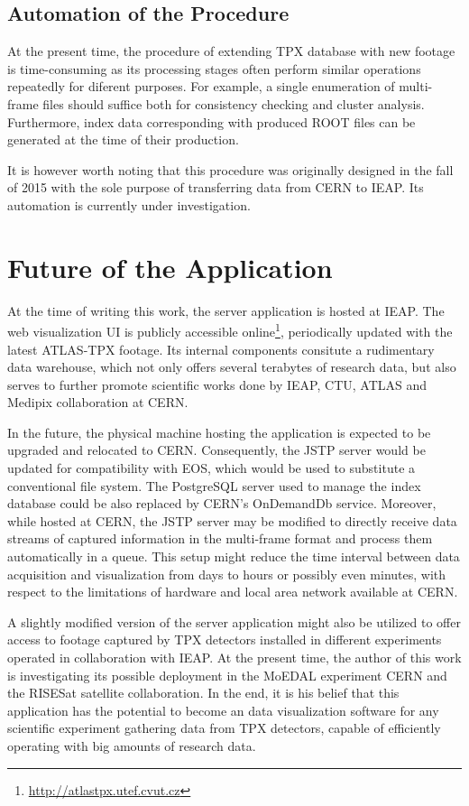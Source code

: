 \subsection{Automation of the Procedure}
\label{import-automation}
At the present time, the procedure of extending TPX database with new footage is time-consuming as its processing stages often perform similar operations repeatedly for diferent purposes. For example, a single enumeration of multi-frame files should suffice both for consistency checking and cluster analysis. Furthermore, index data corresponding with produced ROOT files can be generated at the time of their production.

It is however worth noting that this procedure was originally designed in the fall of 2015 with the sole purpose of transferring data from CERN to IEAP. Its automation is currently under investigation.

\section{Future of the Application}
At the time of writing this work, the server application is hosted at IEAP. The web visualization UI is publicly accessible online\footnote{\url{http://atlastpx.utef.cvut.cz}}, periodically updated with the latest ATLAS-TPX footage. Its internal components consitute a rudimentary data warehouse, which not only offers several terabytes of research data, but also serves to further promote scientific works done by IEAP, CTU, ATLAS and Medipix collaboration at CERN.

In the future, the physical machine hosting the application is expected to be upgraded and relocated to CERN. Consequently, the JSTP server would be updated for compatibility with EOS, which would be used to substitute a conventional file system. The PostgreSQL server used to manage the index database could be also replaced by CERN's OnDemandDb service. Moreover, while hosted at CERN, the JSTP server may be modified to directly receive data streams of captured information in the multi-frame format and process them automatically in a queue. This setup might reduce the time interval between data acquisition and visualization from days to hours or possibly even minutes, with respect to the limitations of hardware and local area network available at CERN.

A slightly modified version of the server application might also be utilized to offer access to footage captured by TPX detectors installed in different experiments operated in collaboration with IEAP. At the present time, the author of this work is investigating its possible deployment in the MoEDAL experiment CERN and the RISESat satellite collaboration. In the end, it is his belief that this application has the potential to become an data visualization software for any scientific experiment gathering data from TPX detectors, capable of efficiently operating with big amounts of research data.
